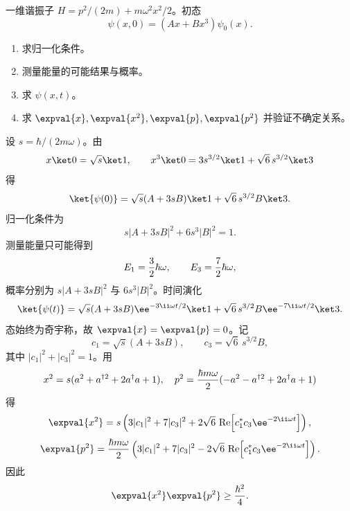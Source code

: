 
\begin{question}
一维谐振子 $H=p^2/(2m)+m\omega^2x^2/2$。初态
\[
  \psi(x,0)=(Ax+Bx^3)\psi_0(x).
\]
\begin{enumerate}
  \item 求归一化条件。
  \item 测量能量的可能结果与概率。
  \item 求 $\psi(x,t)$。
  \item 求 $\expval{x},\expval{x^2},\expval{p},\expval{p^2}$ 并验证不确定关系。
\end{enumerate}
\begin{solution}
设 $s=\hbar/(2m\omega)$。由
\[
  x\ket0=\sqrt{s}\ket1,\qquad
  x^3\ket0=3s^{3/2}\ket1+\sqrt6\,s^{3/2}\ket3
\]
得
\[
  \ket{\psi(0)}=\sqrt s(A+3sB)\ket1+\sqrt6\,s^{3/2}B\ket3.
\]
归一化条件为
\[
  s|A+3sB|^2+6s^3|B|^2=1.
\]
测量能量只可能得到
\[
  E_1={3\over2}\hbar\omega,\qquad E_3={7\over2}\hbar\omega,
\]
概率分别为 $s|A+3sB|^2$ 与 $6s^3|B|^2$。时间演化
\[
  \ket{\psi(t)}=\sqrt s(A+3sB)\ee^{-3\ii\omega t/2}\ket1
  +\sqrt6\,s^{3/2}B\ee^{-7\ii\omega t/2}\ket3.
\]
态始终为奇宇称，故 $\expval{x}=\expval{p}=0$。记
\[
  c_1=\sqrt s(A+3sB),\qquad c_3=\sqrt6\,s^{3/2}B,
\]
其中 $|c_1|^2+|c_3|^2=1$。用
\[
  x^2=s(a^2+a^{\dagger2}+2a^\dagger a+1),\quad
  p^2={\hbar m\omega\over2}(-a^2-a^{\dagger2}+2a^\dagger a+1)
\]
得
\[
  \expval{x^2}=s\left(3|c_1|^2+7|c_3|^2
  +2\sqrt6\,\operatorname{Re}\!\left[c_1^*c_3\ee^{-2\ii\omega t}\right]\right),
\]
\[
  \expval{p^2}={\hbar m\omega\over2}\left(3|c_1|^2+7|c_3|^2
  -2\sqrt6\,\operatorname{Re}\!\left[c_1^*c_3\ee^{-2\ii\omega t}\right]\right).
\]
因此
\[
  \expval{x^2}\expval{p^2}\ge{\hbar^2\over4}.
\]
\end{solution}
\end{question}

